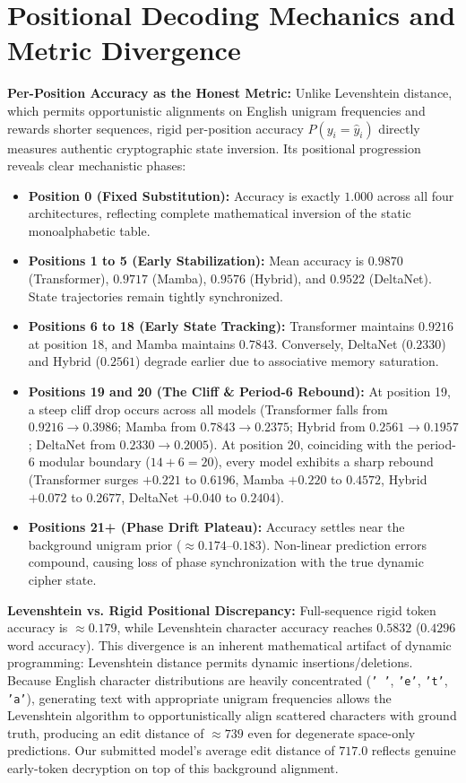 \documentclass[12pt,a4paper]{article}
\begin{document}
\section{Positional Decoding Mechanics and Metric Divergence}
\textbf{Per-Position Accuracy as the Honest Metric:} Unlike Levenshtein distance, which permits opportunistic alignments on English unigram frequencies and rewards shorter sequences, rigid per-position accuracy $P(y_i = \hat{y}_i)$ directly measures authentic cryptographic state inversion. Its positional progression reveals clear mechanistic phases:
\begin{itemize}[leftmargin=*]
    \item \textbf{Position 0 (Fixed Substitution):} Accuracy is exactly $1.000$ across all four architectures, reflecting complete mathematical inversion of the static monoalphabetic table.
    \item \textbf{Positions 1 to 5 (Early Stabilization):} Mean accuracy is $0.9870$ (Transformer), $0.9717$ (Mamba), $0.9576$ (Hybrid), and $0.9522$ (DeltaNet). State trajectories remain tightly synchronized.
    \item \textbf{Positions 6 to 18 (Early State Tracking):} Transformer maintains $0.9216$ at position 18, and Mamba maintains $0.7843$. Conversely, DeltaNet ($0.2330$) and Hybrid ($0.2561$) degrade earlier due to associative memory saturation.
    \item \textbf{Positions 19 and 20 (The Cliff \& Period-6 Rebound):} At position 19, a steep cliff drop occurs across all models (Transformer falls from $0.9216 \to 0.3986$; Mamba from $0.7843 \to 0.2375$; Hybrid from $0.2561 \to 0.1957$; DeltaNet from $0.2330 \to 0.2005$). At position 20, coinciding with the period-6 modular boundary ($14+6=20$), every model exhibits a sharp rebound (Transformer surges $+0.221$ to $0.6196$, Mamba $+0.220$ to $0.4572$, Hybrid $+0.072$ to $0.2677$, DeltaNet $+0.040$ to $0.2404$).
    \item \textbf{Positions 21+ (Phase Drift Plateau):} Accuracy settles near the background unigram prior ($\approx 0.174$--$0.183$). Non-linear prediction errors compound, causing loss of phase synchronization with the true dynamic cipher state.
\end{itemize}

\noindent\textbf{Levenshtein vs. Rigid Positional Discrepancy:} Full-sequence rigid token accuracy is $\approx 0.179$, while Levenshtein character accuracy reaches $0.5832$ ($0.4296$ word accuracy). This divergence is an inherent mathematical artifact of dynamic programming: Levenshtein distance permits dynamic insertions/deletions. Because English character distributions are heavily concentrated (\texttt{' '}, \texttt{'e'}, \texttt{'t'}, \texttt{'a'}), generating text with appropriate unigram frequencies allows the Levenshtein algorithm to opportunistically align scattered characters with ground truth, producing an edit distance of $\approx 739$ even for degenerate space-only predictions. Our submitted model's average edit distance of $717.0$ reflects genuine early-token decryption on top of this background alignment.
\end{document}
